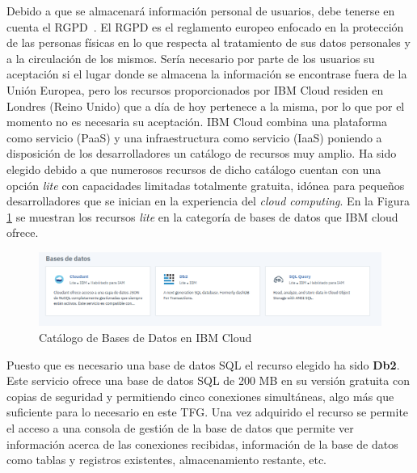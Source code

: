 Debido a que se almacenará información personal de usuarios, debe tenerse en cuenta el \gls{RGPD}~\cite{RGPD}. El \gls{RGPD} es el reglamento europeo enfocado en la protección de las personas físicas en lo que respecta al tratamiento de sus datos personales y a la circulación de los mismos. Sería necesario por parte de los usuarios su aceptación si el lugar donde se almacena la información se encontrase fuera de la Unión Europea, pero los recursos proporcionados por IBM Cloud residen en Londres (Reino Unido) que a día de hoy pertenece a la misma, por lo que por el momento no es necesaria su aceptación. IBM Cloud combina una plataforma como servicio (\gls{PaaS}) y una infraestructura como servicio (\gls{IaaS}) poniendo a disposición de los desarrolladores un catálogo de recursos muy amplio. Ha sido elegido debido a que numerosos recursos de dicho catálogo cuentan con una opción \textit{lite} con capacidades limitadas totalmente gratuita, idónea para pequeños desarrolladores que se inician en la experiencia del \textit{cloud computing}. En la Figura \ref{fig:catalogoIBM} se muestran los recursos \textit{lite} en la categoría de bases de datos que IBM cloud ofrece.
\begin{figure}[H]
            \centering
            \includegraphics[width=16cm]{figs/db_ibm.png}
            \caption{Catálogo de Bases de Datos en IBM Cloud}
            \label{fig:catalogoIBM}
\end{figure}
Puesto que es necesario una base de datos SQL el recurso elegido ha sido \textbf{Db2}. Este servicio ofrece una base de datos SQL de 200 MB en su versión gratuita con copias de seguridad y permitiendo cinco conexiones simultáneas, algo más que suficiente para lo necesario en este \gls{TFG}. Una vez adquirido el recurso se permite el acceso a una consola de gestión de la base de datos que permite ver información acerca de las conexiones recibidas, información de la base de datos como tablas y registros existentes, almacenamiento restante, etc.\\

